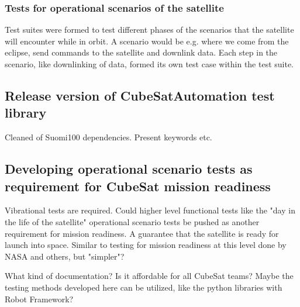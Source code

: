 \documentclass[english,12pt,a4paper,pdftex,elec,utf8]{aaltothesis}
\begin{document}
\subsubsection{Tests for operational scenarios of the satellite}
Test suites were formed to test different phases of the scenarios that the satellite will encounter while in orbit. A scenario would be e.g. where we come from the eclipse, send commands to the satellite and downlink data. Each step in the scenario, like downlinking of data, formed its own test case within the test suite.
\subsection{Release version of CubeSatAutomation test library}
Cleaned of Suomi100 dependencies. Present keywords etc. 
\subsection{Developing operational scenario tests as requirement for CubeSat mission readiness}
Vibrational tests are required. Could higher level functional tests like the "day in the life of the satellite" operational scenario tests be pushed as another requirement for mission readiness. A guarantee that the satellite is ready for launch into space. Similar to testing for mission readiness at this level done by NASA and others, but "simpler"?\par 
What kind of documentation? Is it affordable for all CubeSat teams? Maybe the testing methods developed here can be utilized, like the python libraries with Robot Framework?\par
\end{document}
